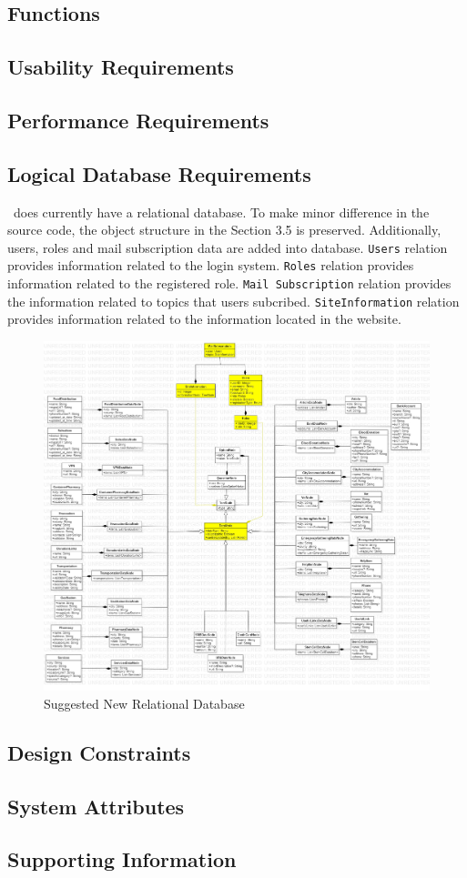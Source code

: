 \subsection{Functions}

\subsection{Usability Requirements}

\subsection{Performance Requirements}

\subsection{Logical Database Requirements}

\afetbilgi\ does currently have a relational database. To make minor difference in the source code, the object structure in the Section 3.5 is preserved. Additionally, users, roles and mail subscription data are added into database. \texttt{Users} relation provides information related to the login system. \texttt{Roles} relation provides information related to the registered role. \texttt{Mail Subscription} relation provides the information related to topics that users subcribed. \texttt{SiteInformation} relation provides information related to the information located in the website.

\begin{figure}[H]
  \centering
  \includegraphics[width=\linewidth]{img/database-s4.jpg}
  \caption{Suggested New Relational Database}
\end{figure}

\subsection{Design Constraints}

\subsection{System Attributes}

\subsection{Supporting Information}

